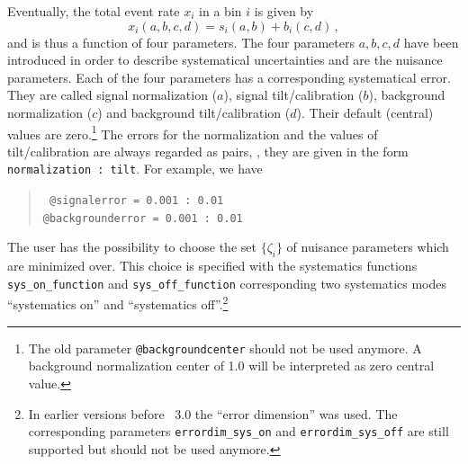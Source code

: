 Eventually, the total event rate $x_i$ in a bin $i$ is given by
\begin{equation}
x_i(a,b,c,d)=s_i(a,b)+b_i(c,d) \, ,
\end{equation}
and is thus a function of four parameters. 
The four parameters $a,b,c,d$ have been introduced in order to describe
systematical uncertainties and are the nuisance parameters.
Each of the four parameters has a corresponding systematical error.
They are called  signal normalization ($a$), signal tilt/calibration ($b$), 
background  normalization ($c$) and
background tilt/calibration ($d$). Their default (central) values are
zero.\footnote{The old parameter {\tt @backgroundcenter} should not be used anymore.
A background normalization center of 1.0 will be interpreted as zero central value.}
The errors for the normalization and the 
values of tilt/calibration are always regarded
as pairs, \ie, they are given in the form {\tt normalization :\ tilt}.
For example, we have
\begin{quote}
{\tt
\tb @signalerror =       0.001  :       0.01\\
\tb @backgrounderror =   0.001 :       0.01
}
\end{quote}
%
The user has the possibility to choose the set $\{\zeta_i\}$ of nuisance 
parameters which are minimized over. This choice is specified with the 
systematics functions {\tt sys\_on\_function} and {\tt sys\_off\_function}
corresponding two systematics modes ``systematics on'' and ``systematics off''.\footnote{In earlier
versions before \GLOBES\ 3.0 the ``error dimension'' was used. The corresponding
parameters {\tt errordim\_sys\_on} and {\tt errordim\_sys\_off} are still supported
but should not be used anymore.}

